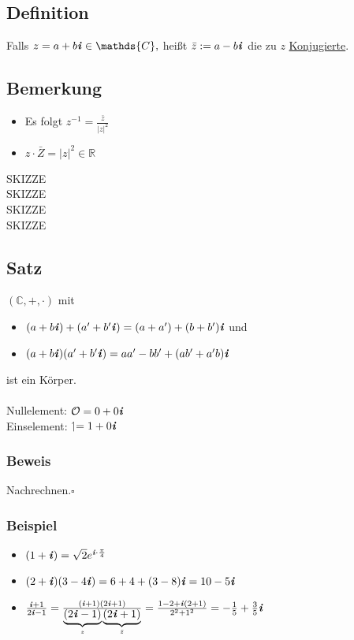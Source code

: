 \documentclass[12pt,titlepage, pdf]{article}
\newcommand{\R}{\mathds{R}}
\newcommand{\C}{\mathds{C}}
\newcommand{\uline}[1]{\underline{#1}}
\newcommand{\qed}{\hfill$\square$}
\renewcommand{\i}{\textbf{\textit{i}}}
\renewcommand{\>}{\rightarrow}
\renewcommand{\*}{\cdot}
\begin{document}
\begin{itemize}
		\subsection{Definition}
	Falls $z = a+b\i \in \C,$ heißt $\bar{z} := a-b\i$ die zu $z$ \uline{Konjugierte}.
\end{itemize}
\subsection{Bemerkung}
\begin{minipage}[c]{0.5\textwidth}
	\begin{itemize}
		\item Es folgt $z^{-1} = \frac{\bar{z}}{|z|^2}$
		\item $z \cdot \bar{Z} = |z|^2 \in \R$
	\end{itemize}
\end{minipage}
\begin{minipage}[c]{0.5\textwidth}
	SKIZZE\\SKIZZE\\SKIZZE\\SKIZZE\\
\end{minipage}
\subsection{Satz}
$(\C, + , \cdot)$ mit 
\begin{itemize}
	\item $(a+b\i)+(a' +b'\i) = (a + a') + (b + b')\i$ und 
	\item $(a+b\i)(a'+ b'\i) = aa' - bb' + (ab' + a'b)\i$
\end{itemize}
ist ein Körper.\\
\\
Nullelement: $\mathcal{O} = 0+0\i$\\
Einselement: $\upharpoonleft = 1+0\i$
\subsubsection*{Beweis} Nachrechnen.\qed
\subsubsection*{Beispiel}
\begin{itemize}
	\item $(1+\i) = \sqrt{2} e^{\i\*\frac{\pi}{4}}$
	\item $(2+\i)(3-4\i) = 6 +4 + (3-8)\i = 10 -5\i$
	\item $\frac{\i+1}{2\i -1} = \frac{(\i+1)(2\i+1)}{\underbrace{(2\i-1)}_{z}\underbrace{(2\i+1)}_{\bar{z}}} =\frac{1-2 +\i(2+1)}{2^2 + 1^2} = -\frac{1}{5} + \frac{3}{5}\i$
\end{itemize}
\end{document}
